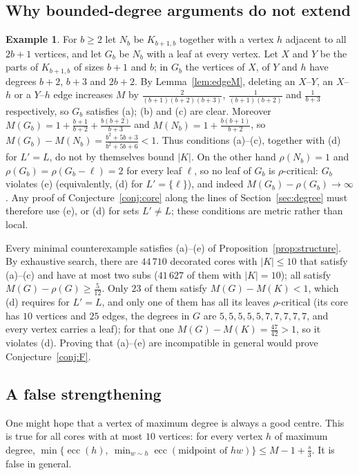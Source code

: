 \documentclass[11pt]{amsart}
\theoremstyle{definition}
\newtheorem{example}[theorem]{Example}
\newcommand{\ecc}{\operatorname{ecc}}
\begin{document}
\subsection{Why bounded-degree arguments do not extend}

\begin{example}\label{ex:nearjoin}
For $b\ge2$ let $N_b$ be $K_{b+1,b}$ together with a vertex $h$ adjacent to all $2b+1$ vertices, and let $G_b$ be
$N_b$ with a leaf at every vertex. Let $X$ and $Y$ be the parts of $K_{b+1,b}$ of sizes $b+1$ and $b$; in $G_b$ the
vertices of $X$, of $Y$ and $h$ have degrees $b+2$, $b+3$ and $2b+2$. By Lemma~\ref{lem:edgeM}, deleting an
$X$--$Y$, an $X$--$h$ or a $Y$--$h$ edge increases $M$ by $\frac2{(b+1)(b+2)(b+3)}$, $\frac1{(b+1)(b+2)}$ and
$\frac1{b+3}$ respectively, so $G_b$ satisfies (a); (b) and (c) are clear. Moreover
$M(G_b)=1+\frac{b+1}{b+2}+\frac{b(b+2)}{b+3}$ and $M(N_b)=1+\frac{b(b+1)}{b+2}$, so
$M(G_b)-M(N_b)=\frac{b^2+5b+3}{b^2+5b+6}<1$. Thus conditions (a)--(c), together with (d) for $L'=L$, do not by
themselves bound $|K|$. On the other hand $\rho(N_b)=1$ and $\rho(G_b)=\rho(G_b-\ell)=2$ for every leaf $\ell$, so no
leaf of $G_b$ is $\rho$-critical: $G_b$ violates (e) (equivalently, (d) for $L'=\{\ell\}$), and indeed
$M(G_b)-\rho(G_b)\to\infty$. Any proof of Conjecture~\ref{conj:core} along the lines of Section~\ref{sec:degree} must
therefore use (e), or (d) for sets $L'\ne L$; these conditions are metric rather than local.
\end{example}

Every minimal counterexample satisfies (a)--(e) of Proposition~\ref{prop:structure}. By exhaustive search, there
are $44\,710$ decorated cores with $|K|\le10$ that satisfy (a)--(c) and have at most two subs ($41\,627$ of them with
$|K|=10$); all satisfy $M(G)-\rho(G)\ge\frac5{12}$. Only $23$ of them satisfy $M(G)-M(K)<1$, which (d) requires
for $L'=L$, and only one of them
has all its leaves $\rho$-critical (its core has $10$ vertices and $25$ edges, the degrees in $G$ are
$5,5,5,5,5,7,7,7,7,7$, and every vertex carries a leaf); for that one $M(G)-M(K)=\frac{47}{42}>1$, so it violates (d).
Proving that (a)--(e) are incompatible in general would prove Conjecture~\ref{conj:F}.

\subsection{A false strengthening}
One might hope that a vertex of maximum degree is always a good centre. This is true for all cores with at most
$10$ vertices: for every vertex $h$ of maximum degree,
$\min\{\ecc(h),\ \min_{w\sim h}\ecc(\text{midpoint of }hw)\}\le M-1+\frac s3$. It is false in general.
\end{document}
